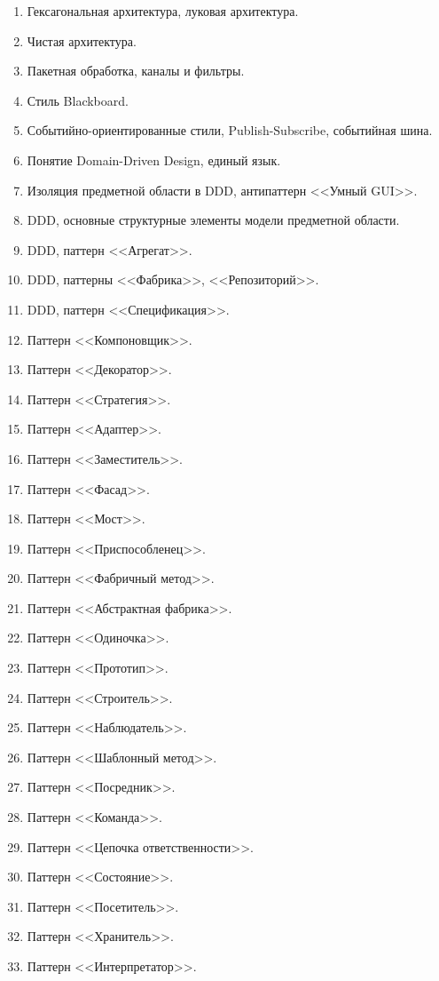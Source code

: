 \documentclass[a5paper]{article}
\begin{document}
\begin{enumerate}
    \item Гексагональная архитектура, луковая архитектура.
    \item Чистая архитектура.
    \item Пакетная обработка, каналы и фильтры. 
    \item Стиль Blackboard.
    \item Событийно-ориентированные стили, Publish-Subscribe, событийная шина.
    \item Понятие Domain-Driven Design, единый язык.
    \item Изоляция предметной области в DDD, антипаттерн <<Умный GUI>>.
    \item DDD, основные структурные элементы модели предметной области.
    \item DDD, паттерн <<Агрегат>>.
    \item DDD, паттерны <<Фабрика>>, <<Репозиторий>>.
    \item DDD, паттерн <<Спецификация>>.
    \item Паттерн <<Компоновщик>>.
    \item Паттерн <<Декоратор>>.
    \item Паттерн <<Стратегия>>.
    \item Паттерн <<Адаптер>>.
    \item Паттерн <<Заместитель>>.
    \item Паттерн <<Фасад>>.
    \item Паттерн <<Мост>>.
    \item Паттерн <<Приспособленец>>.
    \item Паттерн <<Фабричный метод>>.
    \item Паттерн <<Абстрактная фабрика>>.
    \item Паттерн <<Одиночка>>.
    \item Паттерн <<Прототип>>.
    \item Паттерн <<Строитель>>.
    \item Паттерн <<Наблюдатель>>.
    \item Паттерн <<Шаблонный метод>>.
    \item Паттерн <<Посредник>>.
    \item Паттерн <<Команда>>.
    \item Паттерн <<Цепочка ответственности>>.
    \item Паттерн <<Состояние>>.
    \item Паттерн <<Посетитель>>.
    \item Паттерн <<Хранитель>>.
    \item Паттерн <<Интерпретатор>>.

\end{enumerate}
\end{document}
